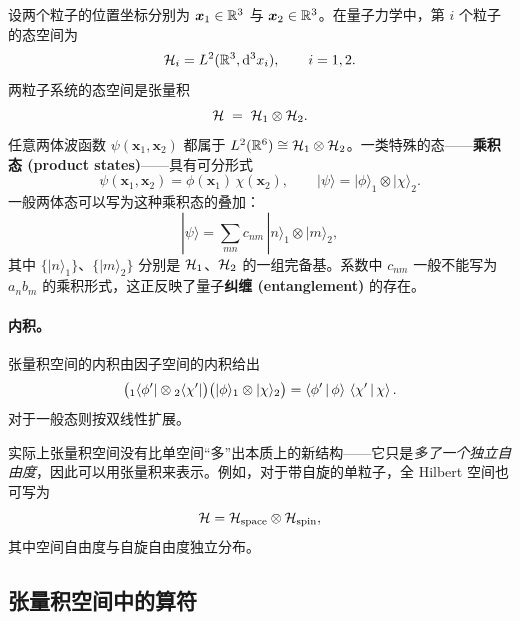 设两个粒子的位置坐标分别为 $\bm{x}_1\in\mathbb{R}^3$ 与 $\bm{x}_2\in\mathbb{R}^3$。在量子力学中，第 $i$ 个粒子的态空间为
\begin{equation}
  \mathcal{H}_i = L^2(\mathbb{R}^3,\mathrm{d}^3 x_i), \qquad i=1,2.
  \label{eq:single-particle-hilbert-2p}
\end{equation}
两粒子系统的态空间是张量积
\begin{equation}
  \mathcal{H} \;=\; \mathcal{H}_1 \otimes \mathcal{H}_2.
  \label{eq:tensor-product-hilbert}
\end{equation}
任意两体波函数 $\psi(\bm{x}_1,\bm{x}_2)$ 都属于 $L^2(\mathbb{R}^6) \cong \mathcal{H}_1\otimes\mathcal{H}_2$。一类特殊的态——\textbf{乘积态 (product states)}——具有可分形式
\begin{equation}
  \psi(\bm{x}_1,\bm{x}_2) = \phi(\bm{x}_1)\,\chi(\bm{x}_2), \qquad |\psi\rangle = |\phi\rangle_1\otimes|\chi\rangle_2.
  \label{eq:product-state}
\end{equation}
一般两体态可以写为这种乘积态的叠加：
\begin{equation}
  |\psi\rangle = \sum_{mn} c_{nm}\,|n\rangle_1\otimes|m\rangle_2,
  \label{eq:general-2body-state}
\end{equation}
其中 $\{|n\rangle_1\}$、$\{|m\rangle_2\}$ 分别是 $\mathcal{H}_1$、$\mathcal{H}_2$ 的一组完备基。系数中 $c_{nm}$ 一般不能写为 $a_n b_m$ 的乘积形式，这正反映了量子\textbf{纠缠 (entanglement)} 的存在。

\paragraph{内积。} 张量积空间的内积由因子空间的内积给出
\begin{equation}
  \big({}_1\langle\phi'|\otimes{}_2\langle\chi'|\big)\big(|\phi\rangle_1\otimes|\chi\rangle_2\big) = \left\langle \phi' \,\middle|\, \phi \right\rangle\,\left\langle \chi' \,\middle|\, \chi \right\rangle.
  \label{eq:tensor-inner-product}
\end{equation}
对于一般态则按双线性扩展。

\begin{remark}
  实际上张量积空间没有比单空间“多”出本质上的新结构——它只是\emph{多了一个独立自由度}，因此可以用张量积来表示。例如，对于带自旋的单粒子，全 Hilbert 空间也可写为
  \[
    \mathcal{H} = \mathcal{H}_{\text{space}} \otimes \mathcal{H}_{\text{spin}},
  \]
  其中空间自由度与自旋自由度独立分布。
\end{remark}

\subsection{张量积空间中的算符}

